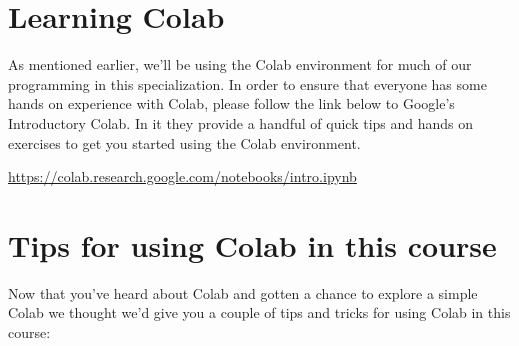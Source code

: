 \section{Learning Colab}

As mentioned earlier, we’ll be using the Colab environment for much of our programming in this specialization. In order to ensure that everyone has some hands on experience with Colab, please follow the link below to Google’s Introductory Colab. In it they provide a handful of quick tips and hands on exercises to get you started using the Colab environment.

\url{https://colab.research.google.com/notebooks/intro.ipynb}


\section{Tips for using Colab in this course}


Now that you’ve heard about Colab and gotten a chance to explore a simple Colab we thought we’d give you a couple of tips and tricks for using Colab in this course:


